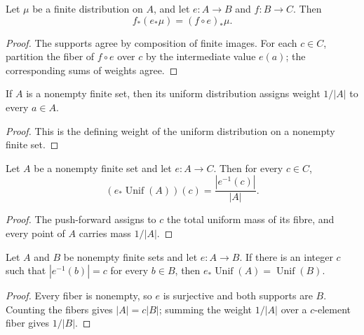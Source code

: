 \begin{lemma}\label{lem:distribution-map-comp}
	\leanok
	Let $\mu$ be a finite distribution on $A$, and let $e\colon A\to B$ and
	$f\colon B\to C$. Then
	\[
		f_\ast(e_\ast\mu)=(f\circ e)_\ast\mu.
	\]
\end{lemma}
\begin{proof}
	\leanok
	The supports agree by composition of finite images.  For each $c\in C$,
	partition the fiber of $f\circ e$ over $c$ by the intermediate value $e(a)$;
	the corresponding sums of weights agree.
\end{proof}

\begin{lemma}\label{lem:uniform-distribution-weight}
	\leanok
	If $A$ is a nonempty finite set, then its uniform distribution assigns weight
	$1/|A|$ to every $a\in A$.
\end{lemma}
\begin{proof}
	\leanok
	This is the defining weight of the uniform distribution on a nonempty finite
	set.
\end{proof}

\begin{lemma}\label{lem:uniform-map-fibre-weight}
	\leanok
	Let $A$ be a nonempty finite set and let $e\colon A\to C$. Then for every
	$c\in C$,
	\[
		(e_\ast\operatorname{Unif}(A))(c)=\frac{|e^{-1}(c)|}{|A|}.
	\]
\end{lemma}
\begin{proof}
	\leanok
	The push-forward assigns to $c$ the total uniform mass of its fibre, and
	every point of $A$ carries mass $1/|A|$.
\end{proof}

\begin{lemma}\label{lem:uniform-map-equal-fibers}
	\leanok
	Let $A$ and $B$ be nonempty finite sets and let $e\colon A\to B$. If there is
	an integer $c$ such that $|e^{-1}(b)|=c$ for every $b\in B$, then
	$e_\ast\operatorname{Unif}(A)=\operatorname{Unif}(B)$.
\end{lemma}
\begin{proof}
	\leanok
	Every fiber is nonempty, so $e$ is surjective and both supports are $B$.
	Counting the fibers gives $|A|=c|B|$; summing the weight $1/|A|$ over a
	$c$-element fiber gives $1/|B|$.
\end{proof}

